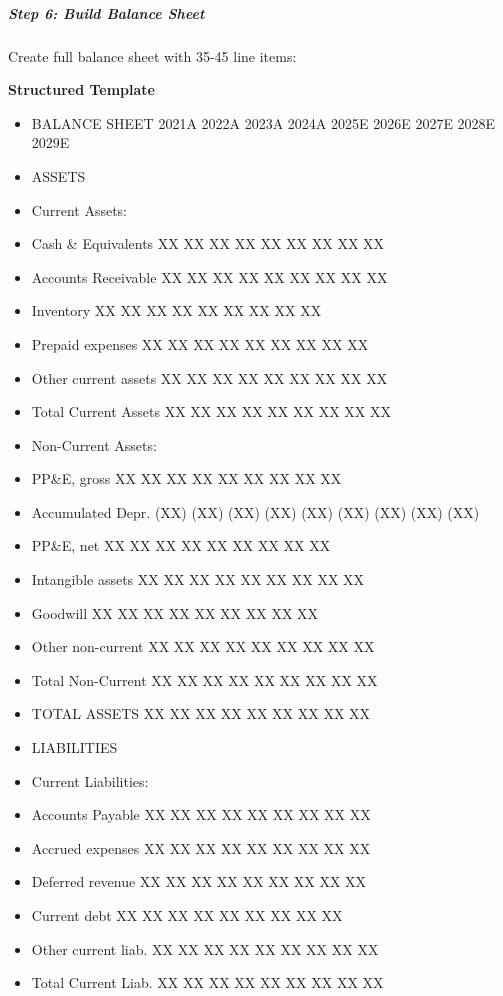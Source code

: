 \documentclass[11pt]{article}
\begin{document}
\subparagraph{Step 6: Build Balance Sheet}\mbox{}\par

Create full balance sheet with 35-45 line items:


\textbf{Structured Template}
\begin{itemize}[leftmargin=*,itemsep=2pt,topsep=2pt]
\item {} BALANCE SHEET 2021A 2022A 2023A 2024A 2025E 2026E 2027E 2028E 2029E
\item {} ASSETS
\item {} Current Assets:
\item {} Cash \& Equivalents XX XX XX XX XX XX XX XX XX
\item {} Accounts Receivable XX XX XX XX XX XX XX XX XX
\item {} Inventory XX XX XX XX XX XX XX XX XX
\item {} Prepaid expenses XX XX XX XX XX XX XX XX XX
\item {} Other current assets XX XX XX XX XX XX XX XX XX
\item {} Total Current Assets XX XX XX XX XX XX XX XX XX
\item {} Non-Current Assets:
\item {} PP\&E, gross XX XX XX XX XX XX XX XX XX
\item {} Accumulated Depr. (XX) (XX) (XX) (XX) (XX) (XX) (XX) (XX) (XX)
\item {} PP\&E, net XX XX XX XX XX XX XX XX XX
\item {} Intangible assets XX XX XX XX XX XX XX XX XX
\item {} Goodwill XX XX XX XX XX XX XX XX XX
\item {} Other non-current XX XX XX XX XX XX XX XX XX
\item {} Total Non-Current XX XX XX XX XX XX XX XX XX
\item {} TOTAL ASSETS XX XX XX XX XX XX XX XX XX
\item {} LIABILITIES
\item {} Current Liabilities:
\item {} Accounts Payable XX XX XX XX XX XX XX XX XX
\item {} Accrued expenses XX XX XX XX XX XX XX XX XX
\item {} Deferred revenue XX XX XX XX XX XX XX XX XX
\item {} Current debt XX XX XX XX XX XX XX XX XX
\item {} Other current liab. XX XX XX XX XX XX XX XX XX
\item {} Total Current Liab. XX XX XX XX XX XX XX XX XX

\end{itemize}
\end{document}
